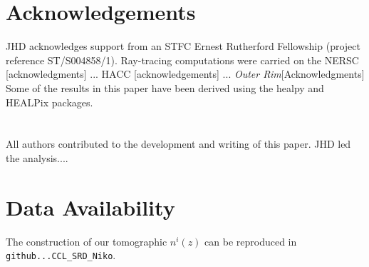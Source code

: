 \documentclass[useAMS,usenatbib]{mn2e}
\begin{document}
\section*{Acknowledgements}

JHD acknowledges support from an STFC Ernest Rutherford Fellowship (project reference ST/S004858/1). Ray-tracing computations were carried on the NERSC [acknowledgments] ... HACC [acknowledgements] ... {\it Outer Rim}[Acknowledgments]
\\

Some of the results in this paper have been derived using the {\sc healpy} and {\sc HEALPix} packages.
\\
\\
\\
{\footnotesize All authors contributed to the development and writing of this paper. JHD led the analysis.... }




\section*{Data Availability}

 
The construction of our tomographic $n^i(z)$ can be reproduced in {\tt github...CCL\_SRD\_Niko}.










\appendix
\end{document}
